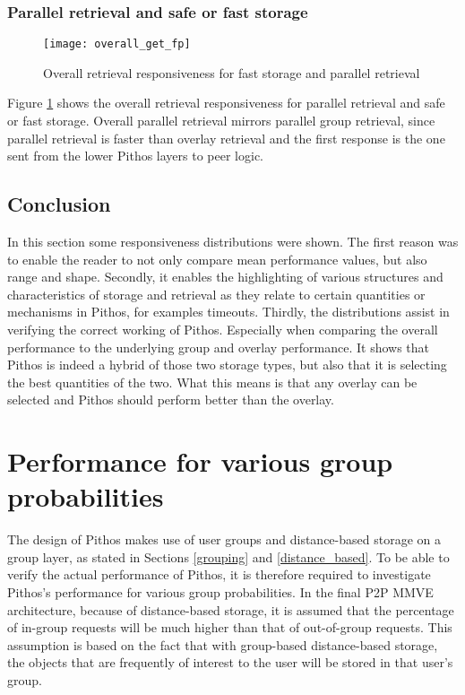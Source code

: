 \subsubsection{Parallel retrieval and safe or fast storage}
\begin{figure}[htbp]
 \centering
 \texttt{[image: overall\_get\_fp]}
 \caption{Overall retrieval responsiveness for fast storage and parallel retrieval}
 \label{fig_overall_get_fp}
\end{figure}
%
Figure \ref{fig_overall_get_fp} shows the overall retrieval responsiveness for parallel retrieval and safe or fast storage. Overall parallel retrieval mirrors parallel group retrieval, since parallel retrieval is faster than overlay retrieval and the first response is the one sent from the lower Pithos layers to peer logic.

\subsection{Conclusion}

In this section some responsiveness distributions were shown. The first reason was to enable the reader to not only compare mean performance values, but also range and shape. Secondly, it enables the highlighting of various structures and characteristics of storage and retrieval as they relate to certain quantities or mechanisms in Pithos, for examples timeouts. Thirdly, the distributions assist in verifying the correct working of Pithos. Especially when comparing the overall performance to the underlying group and overlay performance. It shows that Pithos is indeed a hybrid of those two storage types, but also that it is selecting the best quantities of the two. What this means is that any overlay can be selected and Pithos should perform better than the overlay.

\section{Performance for various group probabilities}
\label{group_probability_results}

The design of Pithos makes use of user groups and distance-based storage on a group layer, as stated in Sections \ref{grouping} and \ref{distance_based}. To be able to verify the actual performance of Pithos, it is therefore required to investigate Pithos's performance for various group probabilities. In the final P2P MMVE architecture, because of distance-based storage, it is assumed that the percentage of in-group requests will be much higher than that of out-of-group requests. This assumption is based on the fact that with group-based distance-based storage, the objects that are frequently of interest to the user will be stored in that user's group.

